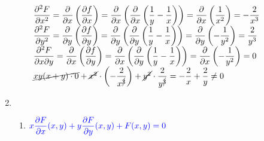 \begin{enumerate}[label=\color{red}\textbf{\arabic*)}, leftmargin=*]
\begin{enumerate}[label=\color{red}\textbf{\alph*)}]
		$\begin{array}{l}
		\dfrac{\partial^2 F}{\partial x^2}=\dfrac{\partial }{\partial x}\left(\dfrac{\partial f}{\partial x}\right)=\dfrac{\partial}{\partial x}\left(\dfrac{\partial }{\partial x}\left(\dfrac{1}{y}-\dfrac{1}{x}\right)\right)=\dfrac{\partial }{\partial x}\left(\dfrac{1}{x^2}\right)=-\dfrac{2}{x^3}\\
		\dfrac{\partial^2 F}{\partial y^2}=\dfrac{\partial }{\partial y}\left(\dfrac{\partial f}{\partial y}\right)=\dfrac{\partial}{\partial y}\left(\dfrac{\partial }{\partial y}\left(\dfrac{1}{y}-\dfrac{1}{x}\right)\right)=\dfrac{\partial}{\partial y}\left(-\dfrac{1}{y^2}\right)=\dfrac{2}{y^3}\\
		\dfrac{\partial^2 F}{\partial x\partial y}=\dfrac{\partial }{\partial x}\left(\dfrac{\partial f}{\partial y}\right)=\dfrac{\partial}{\partial x}\left(\dfrac{\partial }{\partial y}\left(\dfrac{1}{y}-\dfrac{1}{x}\right)\right)=\dfrac{\partial}{\partial x}\left(-\dfrac{1}{y^2}\right)=0\\
		\cancel{xy(x+y)\cdot0}+\cancel{x^2}\cdot\left(-\dfrac{2}{x^{\cancel{3}}}\right)+\cancel{y^2}\cdot\dfrac{2}{y^{\cancel{3}}}=-\dfrac{2}{x}+\dfrac{2}{y}\neq0
		\end{array}$
	\end{enumerate}
	\item {}
	\begin{enumerate}[label=\color{red}\textbf{\alph*)}]
		\item $\textcolor{blue}{x\dfrac{\partial F}{\partial x}(x,y)+y\dfrac{\partial F}{\partial y}(x,y)+F(x,y)=0}$
		

\end{enumerate}
\end{enumerate}
